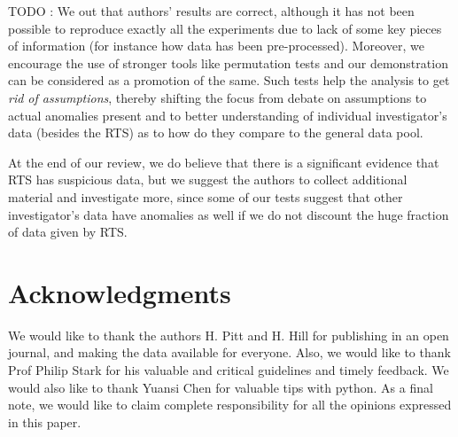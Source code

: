 \documentclass{article}
\begin{document}
TODO : We  out that authors' results are correct, although it has not been
possible to reproduce exactly all the experiments due to lack of some
key pieces of information (for instance how data has been
pre-processed). Moreover, we encourage the use of stronger tools like permutation tests and our demonstration can be considered as a promotion of the same. Such tests help the analysis to get \textit{rid of assumptions}, thereby shifting the focus from debate on assumptions to actual anomalies present and to better understanding of individual
investigator's data (besides the RTS) as to how do they compare to the general data pool.

At the end of our review, we do believe that there is a significant evidence that RTS has suspicious data, but we suggest the authors to collect additional material and investigate more, since some of our tests suggest that other investigator's data have anomalies as well if we do not discount the huge fraction of data given by RTS.

\section*{Acknowledgments} %
\label{sec:acknowledgments}

We would like to thank the authors H. Pitt and H. Hill for publishing in an open journal, and making the data available for everyone. Also, we would like to thank Prof Philip Stark for his valuable and critical guidelines and timely feedback. We would also like to thank Yuansi Chen for valuable tips with python. As a final note, we would like to claim complete responsibility for all the opinions expressed in this paper.






    
\end{document}
